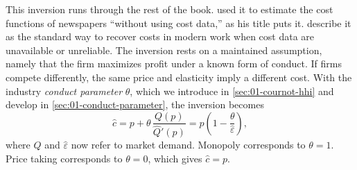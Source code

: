 This inversion runs through the rest of the book. \citet{Rosse1970} used it to estimate the cost functions of
newspapers ``without using cost data,'' as his title puts it. \citet[p.~151]{EinavLevin2010} describe it as the
standard way to recover costs in modern work when cost data are unavailable or unreliable. The inversion rests
on a maintained assumption, namely that the firm maximizes profit under a known form of conduct. If firms
compete differently, the same price and elasticity imply a different cost. With the industry \emph{conduct
parameter} $\theta$, which we introduce in \cref{sec:01-cournot-hhi} and develop in
\cref{sec:01-conduct-parameter}, the inversion becomes
\begin{equation}\label{eq:01-infer-cost-theta}
  \hat c = p + \theta\,\frac{Q(p)}{\hat Q'(p)} = p\left(1 - \frac{\theta}{\hat\varepsilon}\right),
\end{equation}
where $Q$ and $\hat\varepsilon$ now refer to market demand. Monopoly corresponds to $\theta = 1$. Price taking
corresponds to $\theta = 0$, which gives $\hat c = p$.

